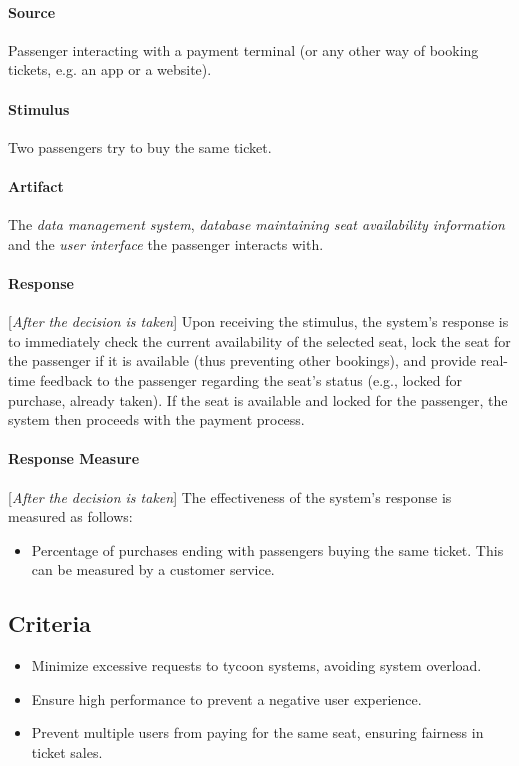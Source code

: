 \paragraph{Source} Passenger interacting with a payment terminal (or any other way of booking tickets, e.g. an app or a website).
\paragraph{Stimulus} Two passengers try to buy the same ticket.
\paragraph{Artifact} The \textit{data management system}, \textit{database maintaining seat availability information} and the \textit{user interface} the passenger interacts with.
\paragraph{Response}[\textit{After the decision is taken}] Upon receiving the stimulus, the system's response is to immediately check the current availability of the selected seat, lock the seat for the passenger if it is available (thus preventing other bookings), and provide real-time feedback to the passenger regarding the seat's status (e.g., locked for purchase, already taken). If the seat is available and locked for the passenger, the system then proceeds with the payment process.
\paragraph{Response Measure}[\textit{After the decision is taken}] The effectiveness of the system's response is measured as follows:
\begin{itemize}
    \item Percentage of purchases ending with passengers buying the same ticket. This can be measured by a customer service.
\end{itemize}

\subsection*{Criteria}
\begin{itemize}
    \item Minimize excessive requests to tycoon systems, avoiding system overload.
    \item Ensure high performance to prevent a negative user experience.
    \item Prevent multiple users from paying for the same seat, ensuring fairness in ticket sales.
\end{itemize}

